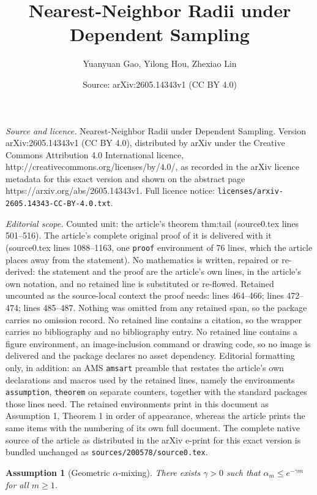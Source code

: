 \documentclass[10pt,a4paper]{amsart}
\title{\LARGE Nearest-Neighbor Radii under Dependent Sampling}
\author{Yuanyuan Gao, Yilong Hou, Zhexiao Lin}
\date{Source: arXiv:2605.14343v1 (CC BY 4.0)}
\newtheorem{assumption}{Assumption}
\begin{document}
\maketitle

\noindent\emph{Source and licence.} \LARGE Nearest-Neighbor Radii under Dependent Sampling. Version arXiv:2605.14343v1 (CC BY 4.0), distributed by arXiv under the Creative Commons Attribution 4.0 International licence, http://creativecommons.org/licenses/by/4.0/, as recorded in the arXiv licence metadata for this exact version and shown on the abstract page https://arxiv.org/abs/2605.14343v1. Full licence notice: \texttt{licenses/arxiv-2605.14343-CC-BY-4.0.txt}.\par\smallskip

\noindent\textit{Editorial scope.} Counted unit: the article's theorem thm:tail (source0.tex lines 501--516). The article's complete original proof of it is delivered with it (source0.tex lines 1088--1163, one \texttt{proof} environment of 76 lines, which the article places away from the statement). No mathematics is written, repaired or re-derived: the statement and the proof are the article's own lines, in the article's own notation, and no retained line is substituted or re-flowed.  Retained uncounted as the source-local context the proof needs: lines 464--466; lines 472--474; lines 485--487.  Nothing was omitted from any retained span, so the package carries no omission record.  No retained line contains a citation, so the wrapper carries no bibliography and no bibliography entry.  No retained line contains a figure environment, an image-inclusion command or drawing code, so no image is delivered and the package declares no asset dependency.  Editorial formatting only, in addition: an AMS \texttt{amsart} preamble that restates the article's own declarations and macros used by the retained lines, namely the environments \texttt{assumption}, \texttt{theorem} on separate counters, together with the standard packages those lines need.  The retained environments print in this document as Assumption 1, Theorem 1 in order of appearance, whereas the article prints the same items with the numbering of its own full document.  The complete native source of the article as distributed in the arXiv e-print for this exact version is bundled unchanged as \texttt{sources/200578/source0.tex}.
\begin{assumption}[Geometric $\alpha$-mixing]\label{ass:geom}
There exists $\gamma>0$ such that $\alpha_m \le e^{-\gamma m}$ for all $m \ge 1$.
\end{assumption}
\end{document}
